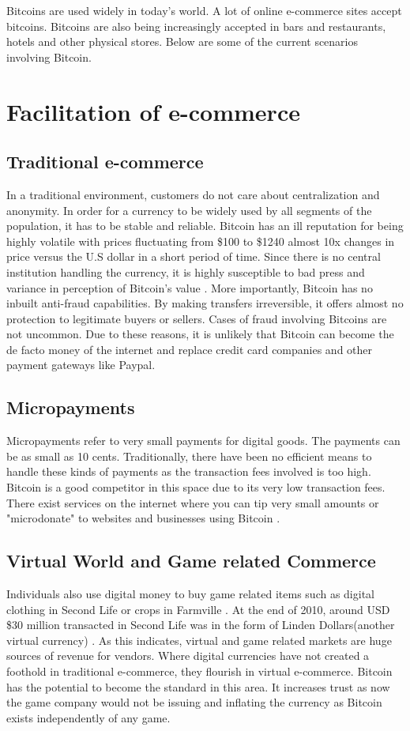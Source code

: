 Bitcoins are used widely in today’s world. A lot of online e-commerce sites accept bitcoins. Bitcoins are also being increasingly accepted in bars and restaurants, hotels and other physical stores. Below are some of the current scenarios involving Bitcoin.

\section{Facilitation of e-commerce}
\subsection{Traditional e-commerce}
In a traditional environment, customers do not care about centralization and anonymity. In order for a currency to be widely used by all segments of the population, it has to be stable and reliable. Bitcoin has an ill reputation for being highly volatile with prices fluctuating from \$100 to \$1240 almost 10x changes in price versus the U.S dollar in a short period of time. Since there is no central institution handling the currency, it is highly susceptible to bad press and variance in perception of Bitcoin’s value \cite{value}. More importantly, Bitcoin has no inbuilt anti-fraud capabilities. By making transfers irreversible, it offers almost no protection to legitimate buyers or sellers. Cases of fraud involving Bitcoins are not uncommon. Due to these reasons, it is unlikely that Bitcoin can become the de facto money of the internet and replace credit card companies and other payment gateways like Paypal. 

\subsection{Micropayments}
Micropayments refer to very small payments for digital goods. The payments can be as small as 10 cents. Traditionally, there have been no efficient means to handle these kinds of payments as the transaction fees involved is too high. Bitcoin is a good competitor in this space due to its very low transaction fees. There exist services on the internet where you can tip very small amounts or "microdonate" to websites and businesses using Bitcoin \cite{value}. 

\subsection{Virtual World and Game related Commerce}
Individuals also use digital money to buy game related items such as digital clothing in Second Life or crops in Farmville \cite{farm}. At the end of 2010, around USD \$30 million transacted in Second Life was in the form of Linden Dollars(another virtual currency) \cite{linden}. As this indicates, virtual and game related markets are huge sources of revenue for vendors. Where digital currencies have not created a foothold in traditional e-commerce, they flourish in virtual e-commerce. Bitcoin has the potential to become the standard in this area. It increases trust as now the game company would not be issuing and inflating the currency as Bitcoin exists independently of any game. 

